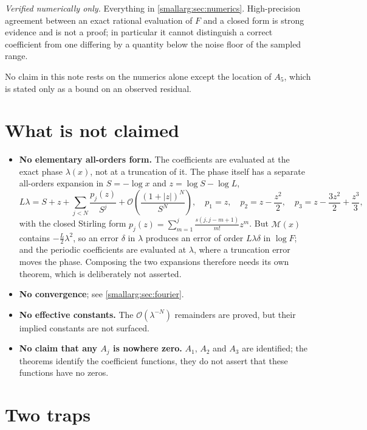 \documentclass[11pt,oneside]{article}
\theoremstyle{definition}
\theoremstyle{remark}
\newcommand{\bigO}{\mathcal O}
\begin{document}
\emph{Verified numerically only.}  Everything in \cref{smallarg:sec:numerics}.
High-precision agreement between an exact rational evaluation of $F$ and a
closed form is strong evidence and is not a proof; in particular it cannot
distinguish a correct coefficient from one differing by a quantity below the
noise floor of the sampled range.

No claim in this note rests on the numerics alone except the location of
$A_5$, which is stated only as a bound on an observed residual.


\section{What is not claimed}\label{smallarg:sec:notclaimed}

\begin{itemize}
\item \textbf{No elementary all-orders form.}  The coefficients are evaluated at
  the exact phase $\lambda(x)$, not at a truncation of it.  The phase itself has
  a separate all-orders expansion in $S=-\log x$ and $z=\log S-\log L$,
  \[
    L\lambda=S+z+\sum_{j<N}\frac{p_j(z)}{S^j}+\bigO\!\left(\frac{(1+|z|)^N}{S^N}\right),
    \quad p_1=z,\quad p_2=z-\frac{z^2}{2},\quad p_3=z-\frac{3z^2}{2}+\frac{z^3}{3},
  \]
  with the closed Stirling form
  $p_j(z)=\sum_{m=1}^{j}\frac{s(j,j-m+1)}{m!}z^m$.  But
  $\mathcal M(x)$ contains $-\tfrac L2\lambda^2$, so an error $\delta$ in
  $\lambda$ produces an error of order $L\lambda\delta$ in $\log F$; and the
  periodic coefficients are evaluated at $\lambda$, where a truncation error
  moves the phase.  Composing the two expansions therefore needs its own
  theorem, which is deliberately not asserted.
\item \textbf{No convergence}; see \cref{smallarg:sec:fourier}.
\item \textbf{No effective constants.}  The $\bigO(\lambda^{-N})$ remainders are
  proved, but their implied constants are not surfaced.
\item \textbf{No claim that any $A_j$ is nowhere zero.}  $A_1$, $A_2$ and $A_3$
  are identified; the theorems identify the coefficient functions, they do not
  assert that these functions have no zeros.
\end{itemize}

\section{Two traps}\label{smallarg:sec:traps}
\end{document}
